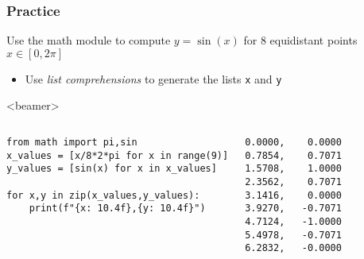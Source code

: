 \begin{frame}[fragile]
  \frametitle{Practice}
  Use the math module to compute $y=\sin(x)$ for 8 equidistant points $x\in \left[0,2\pi\right]$
    \begin{itemize}
      \item Use \emph{list comprehensions} to generate the lists \lstinline|x| and \lstinline|y|
    \end{itemize}\pause
    \begin{onlyenv}<beamer>
      \begin{columns}[T]
        \begin{lstlisting}[]
from math import pi,sin
x_values = [x/8*2*pi for x in range(9)]
y_values = [sin(x) for x in x_values]

for x,y in zip(x_values,y_values):
    print(f"{x: 10.4f},{y: 10.4f}")
        \end{lstlisting}\pause
      \begin{lstlisting}[style=PyOutput]
0.0000,    0.0000
0.7854,    0.7071
1.5708,    1.0000
2.3562,    0.7071
3.1416,    0.0000
3.9270,   -0.7071
4.7124,   -1.0000
5.4978,   -0.7071
6.2832,   -0.0000
      \end{lstlisting}
      \end{columns}
      
    \end{onlyenv}
\end{frame}



